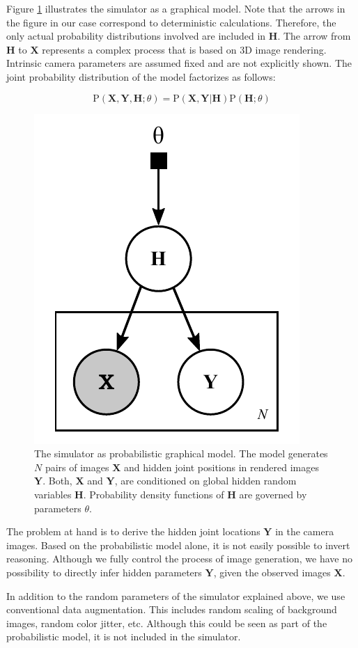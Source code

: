 \documentclass[conference]{IEEEtran}
\begin{document}
    Figure \ref{fig:probModel} illustrates the simulator as a graphical model. Note that the arrows in the figure in our case correspond to deterministic calculations. Therefore, the only actual probability distributions involved are included in $\mathbf{H}$. The arrow from $\mathbf{H}$ to $\mathbf{X}$ represents a complex process that is based on 3D image rendering. Intrinsic camera parameters are assumed fixed and are not explicitly shown. The joint probability distribution of the model factorizes as follows:
    
    \begin{equation}
    \mathrm{P}(\mathbf{X}, \mathbf{Y}, \mathbf{H}; \theta) = \mathrm{P}(\mathbf{X}, \mathbf{Y} | \mathbf{H}) \mathrm{P}(\mathbf{H}; \theta)
    \end{equation}

    \begin{figure}[htbp]
        \centerline{\includegraphics[width=0.33\columnwidth]{figures/probModel/probModel.pdf}}
        \caption{\label{fig:probModel} The simulator as probabilistic graphical model. The model generates $N$ pairs of images $\mathbf{X}$ and hidden joint positions in rendered images $\mathbf{Y}$. Both, $\mathbf{X}$ and $\mathbf{Y}$, are conditioned on global hidden random variables $\mathbf{H}$. Probability density functions of $\mathbf{H}$ are governed by parameters $\theta$.}
    \end{figure}

    The problem at hand is to derive the hidden joint locations $\mathbf{Y}$ in the camera images. Based on the probabilistic model alone, it is not easily possible to invert reasoning. Although we fully control the process of image generation, we have no possibility to directly infer hidden parameters $\mathbf{Y}$, given the observed images $\mathbf{X}$. 
    
    In addition to the random parameters of the simulator explained above, we use conventional data augmentation. This includes random scaling of background images, random color jitter, etc. Although this could be seen as part of the probabilistic model, it is not included in the simulator. 
    
\end{document}
